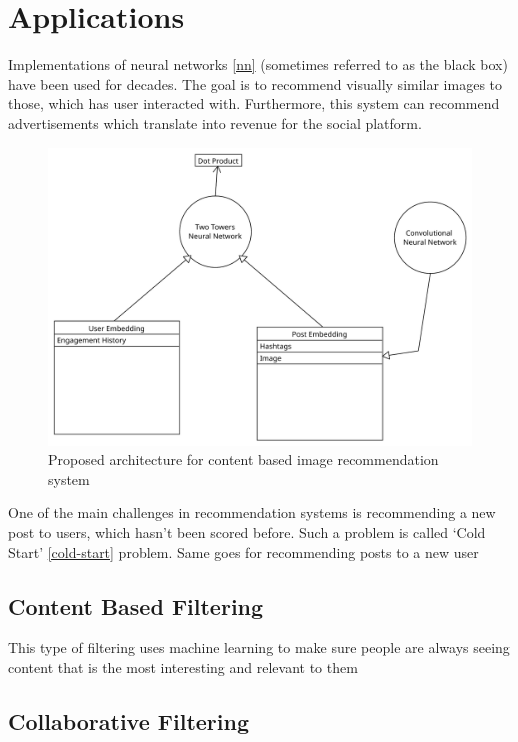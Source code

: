 \section{Applications} \label{applications}

Implementations of neural networks \ref{nn} (sometimes referred to as the black box) have been used for decades. The goal is to recommend visually similar images to those, which has user interacted with. Furthermore, this system can recommend advertisements which translate into revenue for the social platform. 

\begin{figure}[H]
    \centering
    \includegraphics[width=0.7\linewidth]{Diagrams/architecture.pdf}
    \caption{Proposed architecture for content based image recommendation system}
    \label{fig:proposed-alogrithm}
\end{figure}

One of the main challenges in recommendation systems is recommending a new post to users, which hasn't been scored before. Such a problem is called ‘Cold Start' \ref{cold-start} problem. \cite{10373857} Same goes for recommending posts to a new user

\subsection{Content Based Filtering}\label{applications/content-based-filtering}

This type of filtering uses machine learning to make sure people are always seeing content that is the most interesting and relevant to them \cite{ig-new-content}


\subsection{Collaborative Filtering}\label{applications/collaborative-filtering}

